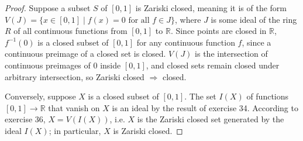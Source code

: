 \documentclass{article}
\begin{document}
\begin{proof}
  Suppose a subset $S$ of $[0,1]$ is Zariski closed, meaning it is of the form $V(J) = \{x \in [0,1] \mid f(x) = 0 \text{ for all } f\in J\}$,
  where $J$ is some ideal of the ring $R$ of all continuous functions from $[0,1]$ to $\mathbb{R}$.
  Since points are closed in $\mathbb{R}$, $f^{-1}(0)$ is a closed subset of $[0,1]$ for any continuous function $f$,
  since a continuous preimage of a closed set is closed.
  $V(J)$ is the intersection of continuous preimages of $0$ inside $[0,1]$, and closed sets remain closed under arbitrary intersection,
  so Zariski closed $\Rightarrow$ closed.

  Conversely, suppose $X$ is a closed subset of $[0,1]$.
  The set $I(X)$ of functions $[0,1] \to \mathbb{R}$ that vanish on $X$ is an ideal by the result of exercise 34.
  According to exercise 36, $X = V(I(X))$, i.e. $X$ is the Zariski closed set generated by the ideal $I(X)$; in particular, $X$ is Zariski closed.
\end{proof}
\end{document}
